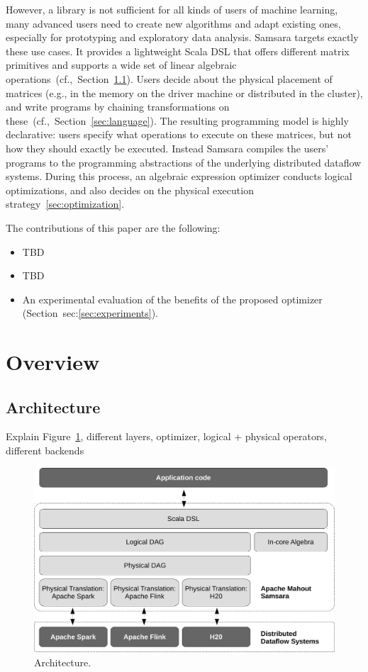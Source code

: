 \documentclass{article}
\begin{document}
However, a library is not sufficient for all kinds of users of machine learning, many advanced users need to create new algorithms and adapt existing ones, especially for prototyping and exploratory data analysis. Samsara targets exactly these use cases. It provides a lightweight Scala DSL that offers different matrix primitives and supports a wide set of linear algebraic operations~(cf.,~Section~\ref{sec:architecture}). Users decide about the physical placement of matrices (e.g., in the memory on the driver machine or distributed in the cluster), and write programs by chaining transformations on these~(cf.,~Section~\ref{sec:language}). The resulting programming model is highly declarative: users specify what operations to execute on these matrices, but not how they should exactly be executed. Instead Samsara compiles the users' programs to the programming abstractions of the underlying distributed dataflow systems. During this process, an algebraic expression optimizer conducts logical optimizations, and also decides on the physical execution strategy~\ref{sec:optimization}.

The contributions of this paper are the following:
\begin{itemize}[noitemsep]
  \item TBD
  \item TBD
  \item An experimental evaluation of the benefits of the proposed optimizer (Section~sec:\ref{sec:experiments}).
\end{itemize}

\section{Overview}

\subsection{Architecture}\label{sec:architecture}


Explain Figure~\ref{fig:architecture}, different layers, optimizer, logical + physical operators, different backends

\begin{figure}
  \centering
  \includegraphics[scale=.5]{figures/architecture-crop}
  \caption{Architecture.}
  \label{fig:architecture}
\end{figure}
\end{document}
